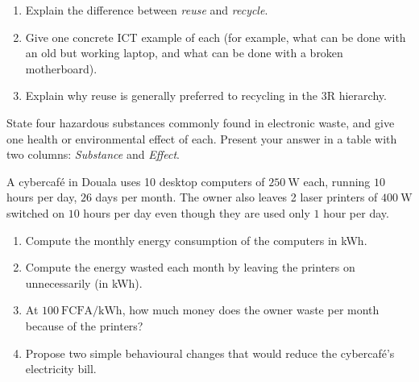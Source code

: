 \documentclass[11pt]{article}
\newcounter{popsec}
\newcounter{popsub}
\newcommand{\courssub}[1]{%
  \stepcounter{popsub}%
  \par\vspace{9pt}\noindent{\popxbold\fontsize{11.5}{13}\selectfont\color{popink}{\color{poporange}\thepopsec.\thepopsub}\hspace{6pt}#1}\par\nopagebreak\vspace{4pt}
}
\begin{document}
\begin{exercice}
\begin{enumerate}
\item Explain the difference between \emph{reuse} and \emph{recycle}.
\item Give one concrete ICT example of each (for example, what can be done with an old but working laptop, and what can be done with a broken motherboard).
\item Explain why reuse is generally preferred to recycling in the 3R hierarchy.
\end{enumerate}
\end{exercice}

\begin{exercice}
State four hazardous substances commonly found in electronic waste, and give one health or environmental effect of each. Present your answer in a table with two columns: \emph{Substance} and \emph{Effect}.
\end{exercice}

\begin{exercice}
A cybercaf\'e in Douala uses 10 desktop computers of $250\ \mathrm{W}$ each, running $10$ hours per day, $26$ days per month. The owner also leaves 2 laser printers of $400\ \mathrm{W}$ switched on $10$ hours per day even though they are used only $1$ hour per day.
\begin{enumerate}
\item Compute the monthly energy consumption of the computers in kWh.
\item Compute the energy wasted each month by leaving the printers on unnecessarily (in kWh).
\item At $100\ \mathrm{FCFA/kWh}$, how much money does the owner waste per month because of the printers?
\item Propose two simple behavioural changes that would reduce the cybercaf\'e's electricity bill.
\end{enumerate}
\end{exercice}

\courssub{I prepare for the GCE}
\end{document}
